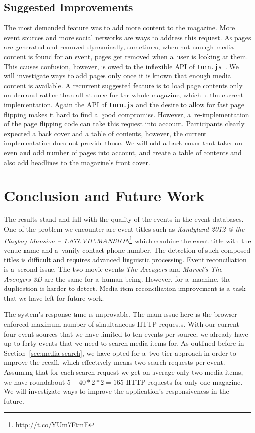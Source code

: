 \documentclass[runningheads,a4paper]{llncs}
\begin{document}
{\subsection{Suggested Improvements}
The most demanded feature was to add more content to the magazine. More event sources and more social networks are ways to address this request. As pages are generated and removed dynamically, sometimes, when not enough media content is found for an event, pages get removed when a~user is looking at them. This causes confusion, however, is owed to the inflexible API of \texttt{turn.js}~\cite{TurnJs2012}. We will investigate ways to add pages only once it is known that enough media content is available. A recurrent suggested feature is to load page contents only on demand rather than all at once for the whole magazine, which is the current implementation. Again the API of \texttt{turn.js} and the desire to allow for fast page flipping makes it hard to find a~good compromise. However, a~re-implementation of the page flipping code can take this request into account. Participants clearly expected a back cover and a table of contents, however,
the current implementation does not provide those. We will add a back cover that takes an even and odd number of pages into account, and create a table of contents and also add headlines to the magazine's front cover.


\section{Conclusion and Future Work}                                        \label{sec:conclusion}
The results stand and fall with the quality of the events in the event databases. One of the problem we encounter are event titles such as
\emph{Kandyland 2012 @ the Playboy Mansion -- 1.877.VIP.MANSION}\footnote{\url{http://t.co/YUm7FtmE}} which combine the event title with the venue name
and a~vanity contact phone number. The detection of such composed titles is difficult and requires advanced linguistic processing. Event reconciliation is a~second issue. The two movie events \emph{The Avengers} and \emph{Marvel's The Avengers 3D} are the same for a~human being. However, for a~machine, the duplication is harder to detect. Media item reconciliation improvement is a~task that we have left for future work.

The system's response time is improvable. The main issue here is the browser-enforced maximum number of simultaneous HTTP requests. With our current four event sources that we have limited to ten events per source, we already have up to forty events that we need to search media items for. As outlined before in Section~\ref{sec:media-search}, we have opted for a~two-tier approach in order to improve the recall, which effectively means two search requests per event.
Assuming that for each search request we get on average only two media items, we have roundabout $5+40*2*2=165$ HTTP requests for only one magazine. We will investigate ways to improve the application's responsiveness in the future.

}
\end{document}
